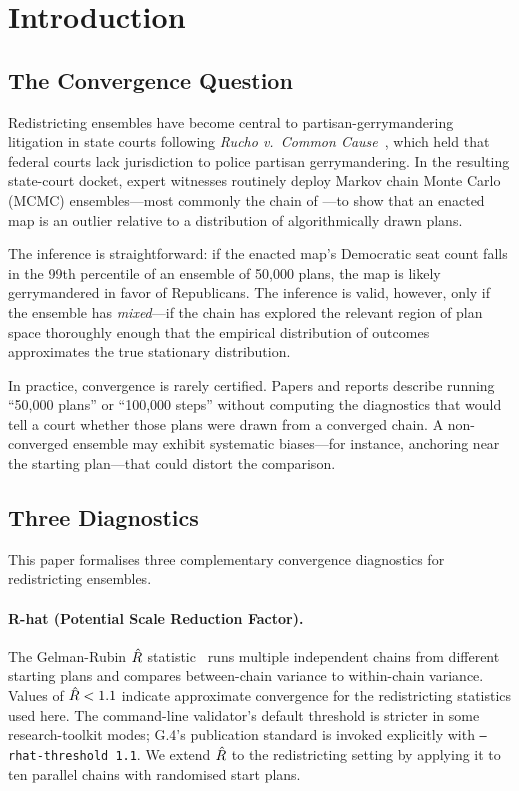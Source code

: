 \section{Introduction}
\label{sec:introduction}

\subsection{The Convergence Question}

Redistricting ensembles have become central to partisan-gerrymandering
litigation in state courts following \textit{Rucho v.\ Common Cause}~\citep{rucho2019},
which held that federal courts lack jurisdiction to police partisan
gerrymandering.
In the resulting state-court docket, expert witnesses routinely deploy
Markov chain Monte Carlo (MCMC) ensembles---most commonly the \recom{}
chain of \citet{deford2021}---to show that an enacted map is an outlier
relative to a distribution of algorithmically drawn plans.

The inference is straightforward: if the enacted map's Democratic seat
count falls in the 99th percentile of an ensemble of 50{,}000 plans, the
map is likely gerrymandered in favor of Republicans.
The inference is valid, however, only if the ensemble has \emph{mixed}---if
the chain has explored the relevant region of plan space thoroughly enough
that the empirical distribution of outcomes approximates the true stationary
distribution.

In practice, convergence is rarely certified.
Papers and reports describe running ``50{,}000 plans'' or ``100{,}000
steps'' without computing the diagnostics that would tell a court whether
those plans were drawn from a converged chain.
A non-converged ensemble may exhibit systematic biases---for instance,
anchoring near the starting plan---that could distort the comparison.

\subsection{Three Diagnostics}

This paper formalises three complementary convergence diagnostics for
redistricting ensembles.

\paragraph{R-hat (Potential Scale Reduction Factor).}
The Gelman-Rubin $\hat{R}$ statistic~\citep{gelman1992} runs multiple
independent chains from different starting plans and compares between-chain
variance to within-chain variance.
Values of $\hat{R} < 1.1$ indicate approximate convergence for the
redistricting statistics used here. The command-line validator's default
threshold is stricter in some research-toolkit modes; G.4's publication
standard is invoked explicitly with \texttt{--rhat-threshold 1.1}.
We extend $\hat{R}$ to the redistricting setting by applying it to ten
parallel \recom{} chains with randomised start plans.


